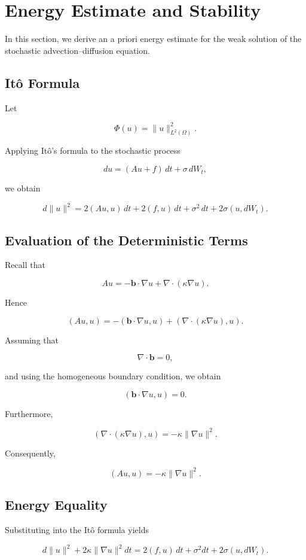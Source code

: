 \section{Energy Estimate and Stability}

In this section, we derive an a priori energy estimate for the weak solution of the stochastic advection--diffusion equation.

\subsection{Itô Formula}

Let

\[
\Phi(u)=\|u\|_{L^2(\Omega)}^2.
\]

Applying Itô's formula to the stochastic process

\[
du=(Au+f)\,dt+\sigma\,dW_t,
\]

we obtain

\[
d\|u\|^2
=
2(Au,u)\,dt
+
2(f,u)\,dt
+
\sigma^2\,dt
+
2\sigma(u,dW_t).
\]

\subsection{Evaluation of the Deterministic Terms}

Recall that

\[
Au
=
-\mathbf b\cdot\nabla u
+
\nabla\cdot(\kappa\nabla u).
\]

Hence

\[
(Au,u)
=
-(\mathbf b\cdot\nabla u,u)
+
(\nabla\cdot(\kappa\nabla u),u).
\]

Assuming that

\[
\nabla\cdot\mathbf b=0,
\]

and using the homogeneous boundary condition, we obtain

\[
(\mathbf b\cdot\nabla u,u)=0.
\]

Furthermore,

\[
(\nabla\cdot(\kappa\nabla u),u)
=
-\kappa\|\nabla u\|^2.
\]

Consequently,

\[
(Au,u)
=
-\kappa\|\nabla u\|^2.
\]

\subsection{Energy Equality}

Substituting into the Itô formula yields

\[
d\|u\|^2
+
2\kappa
\|\nabla u\|^2dt
=
2(f,u)\,dt
+
\sigma^2dt
+
2\sigma(u,dW_t).
\]

